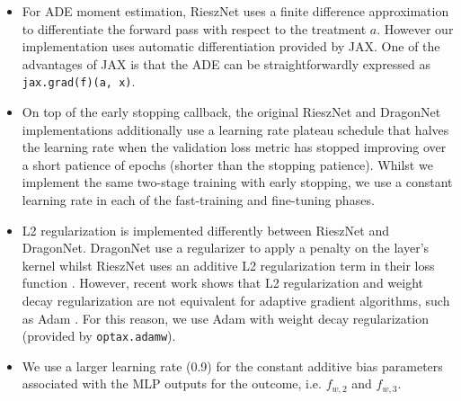 \begin{itemize}
    \item For ADE moment estimation, RieszNet uses a finite difference approximation to differentiate the forward pass with respect to the treatment $a$. However our implementation uses automatic differentiation provided by JAX. One of the advantages of JAX is that the ADE can be straightforwardly expressed as \texttt{jax.grad(f)(a, x)}.
    \item On top of the early stopping callback, the original RieszNet and DragonNet implementations additionally use a learning rate plateau schedule that halves the learning rate when the validation loss metric has stopped improving over a short patience of epochs (shorter than the stopping patience). Whilst we implement the same two-stage training with early stopping, we use a constant learning rate in each of the fast-training and fine-tuning phases.
    \item L2 regularization is implemented differently between RieszNet and DragonNet. DragonNet use a regularizer to apply a penalty on the layer's kernel whilst RieszNet uses an additive L2 regularization term in their loss function \citep[Equation~5]{Chernozhukov2022}. However, recent work shows that L2 regularization and weight decay regularization are not equivalent for adaptive gradient algorithms, such as Adam \citep{loshchilovDecoupledWeightDecay2019}. For this reason, we use Adam with weight decay regularization (provided by \texttt{optax.adamw}).
    \item We use a larger learning rate (0.9) for the constant additive bias parameters associated with the MLP outputs for the outcome, i.e. $f_{w,2}$ and $f_{w,3}$.
\end{itemize}


